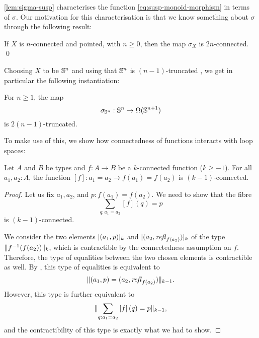 \documentclass[english,a4]{article}
\renewcommand{\ap}[1]{\left[{#1}\right]}
\begin{document}
\cref{lem:sigma-susp} characterises the function \eqref{eq:susp-monoid-morphism}
in terms of $\sigma$.
Our motivation for this characterisation is that we know something about $\sigma$ through the following result:

\begin{theorem} \label{thm:freudenthal}
    If $X$ is $n$-connected and pointed, with $n \geq 0$, then the map $\sigma_X$ is $2n$-connected. \qed
\end{theorem}


Choosing $X$ to be $\Sn n$ and using that $\Sn n$ is $(n-1)$-truncated \cite[Corollary 8.2.2]{HoTT}, we get in particular the following instantiation:


\begin{corollary} \label{cor:sigma-truncated}
For $n \geq 1$, the map
\begin{equation} 
  \sigma_{\Sn n} : \Sn n \to \Omega(\Sn {n+1})
\end{equation}
is $2(n-1)$-truncated.
\end{corollary}


To make use of this, we show how connectedness of functions interacts with loop spaces:

\begin{lemma} \label{lem:conn-ap}
    Let $A$ and $B$ be types and $f : A \to B$ be a $k$-connected function ($k \geq -1$).
    For all $a_1, a_2 : A$, the function $\ap f : a_1 = a_2 \to f(a_1) = f(a_2)$ is $(k-1)$-connected.
\end{lemma}
\begin{proof}
    Let us fix $a_1, a_2$, and $p : f(a_1) = f(a_2)$.
    We need to show that the fibre
    \begin{equation}
      \sum_{q : a_1 = a_2}\ap{f}(q) = p
    \end{equation}
    is $(k-1)$-connected.
    
    We consider the two elements 
    $\highertrunc k {(a_1, p)}$ 
    and  
    $\highertrunc k {(a_2, \refl {f(a_2)})}$ of 
    the type $\higherTrunc k {f^{-1}(f(a_2))}$, which is contractible by the connectedness assumption on $f$.
    Therefore, the type of equalities between the two chosen elements is contractible as well.
    By \cite[Theorem 7.3.12]{HoTT}, this type of equalities is equivalent to
    \begin{equation} \label{eq:eq-in-truncated-fibre}
    \higherTrunc {k-1} {(a_1, p) = (a_2, \refl {f(a_2)})}.
    \end{equation} 
    However, 
    this type is further equivalent to
    \begin{equation}
      \higherTrunc {k-1} {\sum_{q : a_1 = a_2} \ap f(q) = p},
    \end{equation} 
    and the contractibility of this type is exactly what we had to show.
\end{proof}
\end{document}
